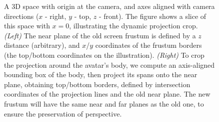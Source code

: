 \begin{figure}[htb]
	\centering
	\caption{A 3D space with origin at the camera, and axes aligned with camera directions ($x$ - right, $y$ - top, $z$ - front). The figure shows a slice of this space with $x=0$, illustrating the dynamic projection crop. \textit{(Left)} The near plane of the old screen frustum is defined by a $z$ distance (arbitrary), and $x$/$y$ coordinates of the frustum borders (the top/bottom coordinates on the illustration). \textit{(Right)} To crop the projection around the avatar's body, we compute an axis-aligned bounding box of the body, then project its spans onto the near plane, obtaining top/bottom borders, defined by intersection coordinates of the projection lines and the old near plane. The new frustum will have the same near and far planes as the old one, to ensure the preservation of perspective.}
	\label{fig:dynamic_crop_math}
\end{figure}

